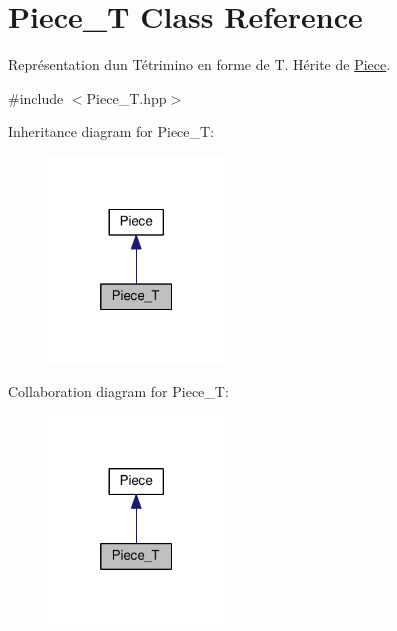 \hypertarget{classPiece__T}{}\section{Piece\+\_\+T Class Reference}
\label{classPiece__T}


Représentation d\textquotesingle{}un Tétrimino en forme de T. Hérite de \hyperlink{classPiece}{Piece}.  




{\ttfamily \#include $<$Piece\+\_\+\+T.\+hpp$>$}



Inheritance diagram for Piece\+\_\+T\+:
\nopagebreak
\begin{figure}[H]
\begin{center}
\leavevmode
\includegraphics[width=133pt]{classPiece__T__inherit__graph}
\end{center}
\end{figure}


Collaboration diagram for Piece\+\_\+T\+:
\nopagebreak
\begin{figure}[H]
\begin{center}
\leavevmode
\includegraphics[width=133pt]{classPiece__T__coll__graph}
\end{center}
\end{figure}
